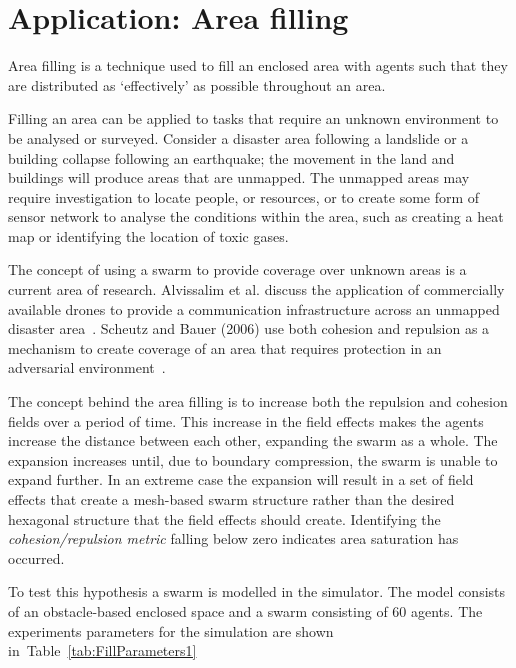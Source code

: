 \documentclass{ieeeaccess}
\begin{document}
\section{Application: Area filling}\label{Section:ApplicationFloodFilling}

Area filling is a technique used to fill an enclosed area with agents such that
they are distributed as `effectively' as possible throughout an area. 

Filling an area can be applied to tasks that require an unknown environment to
be analysed or surveyed. Consider a disaster area following a landslide or a
building collapse following an earthquake; the movement in the land and
buildings will produce areas that are unmapped. The unmapped areas may require
investigation to locate people, or resources, or to create some form of sensor
network to analyse the conditions within the area, such as creating a heat map
or identifying the location of toxic gases. 

The concept of using a swarm to provide coverage over unknown areas is a
current area of research. Alvissalim et al. discuss the application of
commercially available drones to provide a communication infrastructure across
an unmapped disaster area~\cite{AZHMJJM:12}. Scheutz and Bauer (2006) use both
cohesion and repulsion as a mechanism to create coverage of an area that
requires protection in an adversarial environment~\cite{SB:06}.

The concept behind the area filling is to increase both the repulsion and
cohesion fields over a period of time. This increase in the field effects makes
the agents increase the distance between each other, expanding the swarm as a
whole. The expansion increases until, due to boundary compression, the swarm is
unable to expand further. In an extreme case the expansion will result in a set
of field effects that create a mesh-based swarm structure rather than the
desired hexagonal structure that the field effects should create. Identifying
the \textit{cohesion/repulsion metric} falling below zero indicates area
saturation has occurred.

To test this hypothesis a swarm is modelled in the simulator. The model
consists of an obstacle-based enclosed space and a swarm consisting of 60
agents. The experiments parameters for the simulation are shown
in~Table~\ref{tab:FillParameters1}
\end{document}
